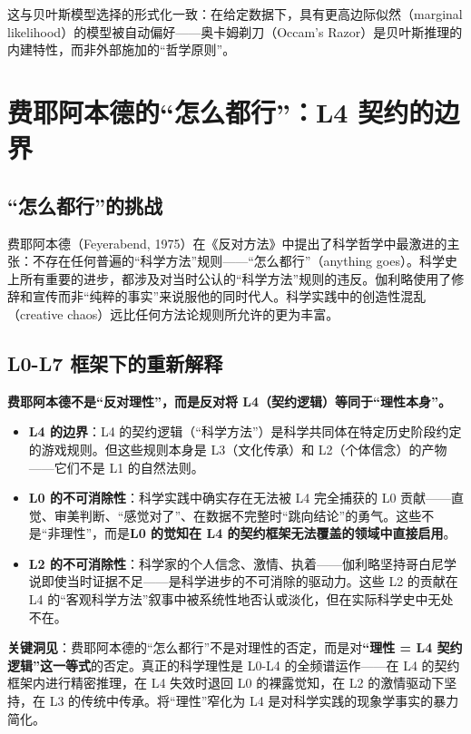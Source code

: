\documentclass[UTF8,12pt,a4paper]{ctexart}
\begin{document}
这与贝叶斯模型选择的形式化一致：在给定数据下，具有更高边际似然（marginal likelihood）的模型被自动偏好——奥卡姆剃刀（Occam's Razor）是贝叶斯推理的内建特性，而非外部施加的``哲学原则''。

\section{费耶阿本德的``怎么都行''：L4 契约的边界}

\subsection{``怎么都行''的挑战}

费耶阿本德（Feyerabend, 1975）在《反对方法》中提出了科学哲学中最激进的主张：不存在任何普遍的``科学方法''规则——``怎么都行''（anything goes）。科学史上所有重要的进步，都涉及对当时公认的``科学方法''规则的违反。伽利略使用了修辞和宣传而非``纯粹的事实''来说服他的同时代人。科学实践中的创造性混乱（creative chaos）远比任何方法论规则所允许的更为丰富。

\subsection{L0-L7 框架下的重新解释}

\textbf{费耶阿本德不是``反对理性''，而是反对将 L4（契约逻辑）等同于``理性本身''。}

\begin{itemize}[nosep]
    \item \textbf{L4 的边界}：L4 的契约逻辑（``科学方法''）是科学共同体在特定历史阶段约定的游戏规则。但这些规则本身是 L3（文化传承）和 L2（个体信念）的产物——它们不是 L1 的自然法则。
    \item \textbf{L0 的不可消除性}：科学实践中确实存在无法被 L4 完全捕获的 L0 贡献——直觉、审美判断、``感觉对了''、在数据不完整时``跳向结论''的勇气。这些不是``非理性''，而是\textbf{L0 的觉知在 L4 的契约框架无法覆盖的领域中直接启用}。
    \item \textbf{L2 的不可消除性}：科学家的个人信念、激情、执着——伽利略坚持哥白尼学说即使当时证据不足——是科学进步的不可消除的驱动力。这些 L2 的贡献在 L4 的``客观科学方法''叙事中被系统性地否认或淡化，但在实际科学史中无处不在。
\end{itemize}

\textbf{关键洞见}：费耶阿本德的``怎么都行''不是对理性的否定，而是对\textbf{``理性 = L4 契约逻辑''这一等式}的否定。真正的科学理性是 L0-L4 的全频谱运作——在 L4 的契约框架内进行精密推理，在 L4 失效时退回 L0 的裸露觉知，在 L2 的激情驱动下坚持，在 L3 的传统中传承。将``理性''窄化为 L4 是对科学实践的现象学事实的暴力简化。
\end{document}
